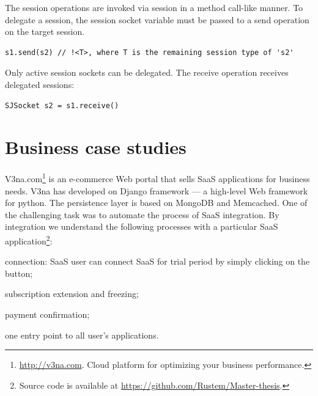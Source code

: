 \documentclass{llncs}
\begin{document}
The session operations are invoked via session in a method call-like manner. To delegate a session, the session socket variable must be passed to a send operation on the target session.

\begin{lstlisting}
s1.send(s2) // !<T>, where T is the remaining session type of 's2'
\end{lstlisting}


Only active session sockets can be delegated. The receive operation receives delegated sessions:

\begin{lstlisting}
SJSocket s2 = s1.receive()
\end{lstlisting}

\section{Business case studies}
\label{sect:impl}

V3na.com\footnote{\url{http://v3na.com}. Cloud platform for optimizing your business performance.}
is an e-commerce Web portal that sells SaaS applications for business needs. V3na has developed on Django framework --- a high-level Web framework for python. %
The persistence layer is based on MongoDB and Memcached. One of the challenging task was to automate the process of SaaS integration. By integration we understand the following processes with a particular SaaS application\footnote{Source code is available at \url{https://github.com/Rustem/Master-thesis}.}:

\begin{compactitem}
\item  connection: SaaS user can connect SaaS for trial period by simply clicking on the button;

\item  subscription extension and freezing;

\item  payment confirmation;

\item one entry point to all user's applications.
\end{compactitem}
\end{document}
